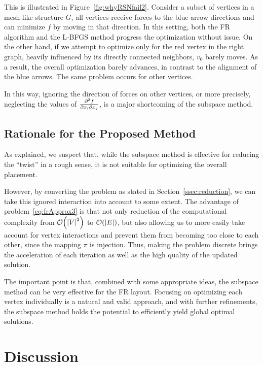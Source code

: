 \documentclass[dvipdfmx,journal]{IEEEtran}
\begin{document}
This is illustrated in Figure~\ref{fig:whyRSNfail2}.
Consider a subset of vertices in a mesh-like structure $G$, all vertices receive forces to the blue arrow directions and can minimize $f$ by moving in that direction.
In this setting, both the FR algorithm and the L-BFGS method progress the optimization without issue.
On the other hand, if we attempt to optimize only for the red vertex in the right graph, heavily influenced by its directly connected neighbors, $v_0$ barely moves.
As a result, the overall optimization barely advances, in contrast to the alignment of the blue arrows.
The same problem occurs for other vertices.

In this way, ignoring the direction of forces on other vertices, or more precisely, neglecting the values of $\pdv{f}{x_i}{x_j}$, is a major shortcoming of the subspace method.

\subsection{Rationale for the Proposed Method}\label{ssec:rationale}

As explained, we suspect that, while the subspace method is effective for reducing the ``twist'' in a rough sense, it is not suitable for optimizing the overall placement.

However, by converting the problem as stated in Section~\ref{ssec:reduction}, we can take this ignored interaction into account to some extent.
The advantage of problem~\eqref{eq:frApprox3} is that not only reduction of the computational complexity from $\order{\abs{V}^2}$ to $\order{\abs{E}}$, but also allowing us to more easily take account for vertex interactions and prevent them from becoming too close to each other, since the mapping $\pi$ is injection.
Thus, making the problem discrete brings the acceleration of each iteration as well as the high quality of the updated solution.

The important point is that, combined with some appropriate ideas, the subspace method can be very effective for the FR layout.
Focusing on optimizing each vertex individually is a natural and valid approach, and with further refinements, the subspace method holds the potential to efficiently yield global optimal solutions.

\section{Discussion} \label{sec:discussion}
\end{document}
